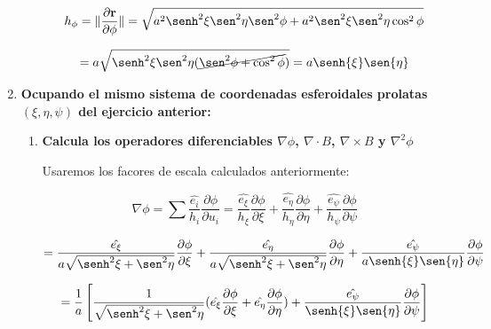 \documentclass[12pt,a4paper]{article}
\providecommand{\norm}[1]{\lVert#1\rVert}
\begin{document}
\begin{enumerate}
\begin{enumerate}
        \begin{equation*}
            h_\phi = \norm{\frac{\partial \textbf{r}}{\partial \phi}} = \sqrt{a^2\senh^2{\xi}\sen^2{\eta}\sen^2{\phi} + a^2 \sen^2{\xi} \sen^2{\eta}\cos^2{\phi}}
        \end{equation*}
        
        \begin{equation*}
            = a \sqrt{\senh^2{\xi}\sen^2{\eta}(\cancel{\sen^2{\phi} + \cos^2{\phi}})} = a \senh{\xi}\sen{\eta}
        \end{equation*}
        
    \end{enumerate}
    
    \item \textbf{Ocupando el mismo sistema de coordenadas esferoidales prolatas $(\xi, \eta, \psi)$ del ejercicio anterior:}
    
    \begin{enumerate}
        \item \textbf{Calcula los operadores diferenciables $\nabla \phi$, $\nabla \cdot B$, $\nabla \times B$ y $\nabla ^2 \phi$}
        
        Usaremos los facores de escala calculados anteriormente:
        
        \begin{equation*}
            \nabla \phi = \sum \frac{\hat{e_i}}{h_i} \frac{\partial \phi}{\partial u_i} = \frac{\hat{e_\xi}}{h_\xi} \frac{\partial \phi}{\partial \xi} + \frac{\hat{e_\eta}}{h_\eta} \frac{\partial \phi}{\partial \eta} + \frac{\hat{e_\psi}}{h_\psi} \frac{\partial \phi}{\partial \psi}
        \end{equation*}
            
        \begin{equation*}
            = \frac{\hat{e_\xi}}{a \sqrt{\senh^2{\xi}+\sen^2{\eta}}} \frac{\partial \phi}{\partial \xi} + \frac{\hat{e_\eta}}{a \sqrt{\senh^2{\xi} + \sen^2{\eta}}} \frac{\partial \phi}{\partial \eta} + \frac{\hat{e_\psi}}{a \senh{\xi} \sen{\eta}} \frac{\partial \phi}{\partial \psi}
        \end{equation*}
        
        \begin{equation*}
            = \frac{1}{a}\left[\frac{1}{\sqrt{\senh^2{\xi} + \sen^2{\eta}}} (\hat{e_\xi} \frac{\partial \phi}{\partial \xi} + \hat{e_\eta}\frac{\partial \phi}{\partial \eta})+ \frac{\hat{e_\psi}}{\senh{\xi} \sen{\eta}} \frac{\partial \phi}{\partial \psi} \right]
        \end{equation*}
        

\end{enumerate}
\end{enumerate}
\end{document}
